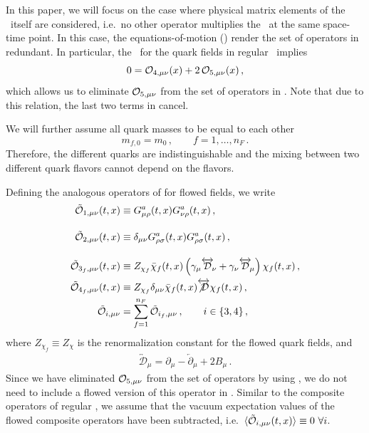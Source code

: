 In this paper, we will focus on the case where physical matrix elements
of the \emt\ itself are considered, i.e.\ no other operator multiplies
the \emt\ at the same space-time point. In this case, the
equations-of-motion (\eom{}) render the set of operators in 
redundant. In particular, the \eom\ for the quark fields in regular
\qcd\ implies
\begin{equation}
  0 = \mathcal{O}_{4, \mu \nu} (x) + 2 \, \mathcal{O}_{5, \mu \nu} (x) \,,
  \label{eq:eom}
\end{equation}
which allows us to eliminate $\mathcal{O}_{5,\mu\nu}$ from the set of
operators in . Note that due to this relation, the last two
terms in  cancel.

We will further assume all quark masses to be equal to each other
\begin{equation}
	m_{f, 0} = m_0\,, \qquad f=1,\ldots,n_F\,.
\end{equation}
Therefore, the different quarks are indistinguishable and the
mixing between two different quark flavors cannot depend
on the flavors.

Defining the analogous operators of  for flowed fields, we
write
\begin{equation}
  \begin{split}
    \tilde{\mathcal{O}}_{1,\mu\nu}(t,x) &\equiv
    G_{\mu\rho}^a(t,x)G_{\nu\rho}^a(t,x)\,,\\[10pt]
    \tilde{\mathcal{O}}_{2,\mu\nu}(t,x) &\equiv
    \delta_{\mu\nu}G_{\rho\sigma}^a(t,x)G_{\rho\sigma}^a(t,x)\,,\\[10pt]
    \tilde{\mathcal{O}}_{3_f,\mu\nu}(t,x) &\equiv Z_{\chi_f}
    \bar\chi_{f}(t,x)\left(\gamma_\mu\overleftrightarrow{\mathcal{D}}\!_\nu
    +\gamma_\nu\overleftrightarrow{\mathcal{D}}\!_\mu\right)\chi_{f}(t,x)\,,\\
    \tilde{\mathcal{O}}_{4_f,\mu\nu}(t,x)
    &\equiv Z_{\chi_f} \delta_{\mu\nu}\bar\chi_{f}(t,x)
    \overleftrightarrow{\not{\mathcal{D}}}\chi_{f}(t,x)\,,
    \\
    \tilde{\mathcal{O}}_{i,\mu\nu} &= \sum_{f=1}^{n_F}\tilde{\mathcal{O}}_{i_f,\mu\nu}\,,\qquad i\in\{3,4\}\,,
    \label{eq:tops}
  \end{split}
\end{equation}
where $Z_{\chi_f}\equiv Z_\chi$ is the renormalization constant for the
flowed quark fields, and
\begin{equation}
  \begin{split}
    \overleftrightarrow{\mathcal{D}}\!_\mu = \partial_\mu -
    \overleftarrow{\partial}\!_\mu + 2B_\mu\,.
    \label{eq:leftrightcalD}
  \end{split}
\end{equation}
Since we have eliminated $\mathcal{O}_{5,\mu\nu}$ from the set of operators by
using , we do not need to include a flowed version of this
operator in . Similar to the composite operators of regular
\qcd, we assume that the vacuum expectation values of the flowed
composite operators have been subtracted,
i.e.\ $\langle\tcalo_{i,\mu\nu}(t,x)\rangle\equiv 0\ \forall i$.

